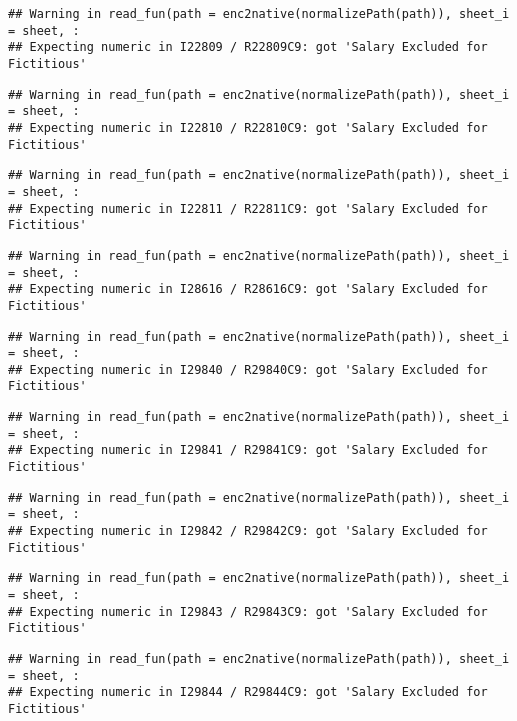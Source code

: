 \documentclass[
]{article}
\begin{document}
\begin{verbatim}
## Warning in read_fun(path = enc2native(normalizePath(path)), sheet_i = sheet, :
## Expecting numeric in I22809 / R22809C9: got 'Salary Excluded for Fictitious'
\end{verbatim}

\begin{verbatim}
## Warning in read_fun(path = enc2native(normalizePath(path)), sheet_i = sheet, :
## Expecting numeric in I22810 / R22810C9: got 'Salary Excluded for Fictitious'
\end{verbatim}

\begin{verbatim}
## Warning in read_fun(path = enc2native(normalizePath(path)), sheet_i = sheet, :
## Expecting numeric in I22811 / R22811C9: got 'Salary Excluded for Fictitious'
\end{verbatim}

\begin{verbatim}
## Warning in read_fun(path = enc2native(normalizePath(path)), sheet_i = sheet, :
## Expecting numeric in I28616 / R28616C9: got 'Salary Excluded for Fictitious'
\end{verbatim}

\begin{verbatim}
## Warning in read_fun(path = enc2native(normalizePath(path)), sheet_i = sheet, :
## Expecting numeric in I29840 / R29840C9: got 'Salary Excluded for Fictitious'
\end{verbatim}

\begin{verbatim}
## Warning in read_fun(path = enc2native(normalizePath(path)), sheet_i = sheet, :
## Expecting numeric in I29841 / R29841C9: got 'Salary Excluded for Fictitious'
\end{verbatim}

\begin{verbatim}
## Warning in read_fun(path = enc2native(normalizePath(path)), sheet_i = sheet, :
## Expecting numeric in I29842 / R29842C9: got 'Salary Excluded for Fictitious'
\end{verbatim}

\begin{verbatim}
## Warning in read_fun(path = enc2native(normalizePath(path)), sheet_i = sheet, :
## Expecting numeric in I29843 / R29843C9: got 'Salary Excluded for Fictitious'
\end{verbatim}

\begin{verbatim}
## Warning in read_fun(path = enc2native(normalizePath(path)), sheet_i = sheet, :
## Expecting numeric in I29844 / R29844C9: got 'Salary Excluded for Fictitious'
\end{verbatim}
\end{document}
